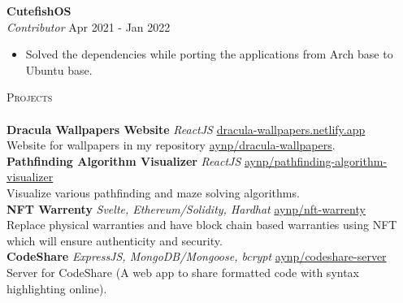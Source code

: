 \documentclass[a4paper]{article}
\newcommand{\lineunder} {
    \vspace*{-8pt} \\
    \hspace*{-18pt} \hrulefill \\
}
\newcommand{\header} [1] {
    {\hspace*{-18pt}\vspace*{6pt} \textsc{#1}}
    \vspace*{-6pt} \lineunder
}
\begin{document}
\vspace{-1mm}
\textbf{CutefishOS}\\
\textit{Contributor} \hfill Apr 2021 - Jan 2022\\
\vspace{-2mm}
\begin{itemize} \itemsep -4pt
	\item Solved the dependencies while porting the applications from Arch base to Ubuntu base.
\end{itemize}

\header{Projects}
\vspace{1mm}
{\textbf{Dracula Wallpapers Website}} {\sl ReactJS} \hfill \href{https://dracula-wallpapers.netlify.app/}{dracula-wallpapers.netlify.app}\\
Website for wallpapers in my repository \href{https://github.com/aynp/dracula-wallpapers}{aynp/dracula-wallpapers}.\\
\vspace*{2mm}
{\textbf{Pathfinding Algorithm Visualizer}} {\sl ReactJS} \hfill \href{https://github.com/aynp/pathfinding-algorithm-visualizer}{aynp/pathfinding-algorithm-visualizer}\\
Visualize various pathfinding and maze solving algorithms.\\
\vspace*{2mm}
{\textbf{NFT Warrenty}} {\sl Svelte, Ethereum/Solidity, Hardhat} \hfill \href{https://github.com/aynp/nft-warrenty}{aynp/nft-warrenty}\\
Replace physical warranties and have block chain based warranties using NFT which will ensure authenticity and security.\\
\vspace*{2mm}
{\textbf{CodeShare}} {\sl ExpressJS, MongoDB/Mongoose, bcrypt} \hfill \href{https://github.com/aynp/codeshare-server}{aynp/codeshare-server}\\
Server for CodeShare (A web app to share formatted code with syntax highlighting online).\\
\vspace*{2mm}
\end{document}

